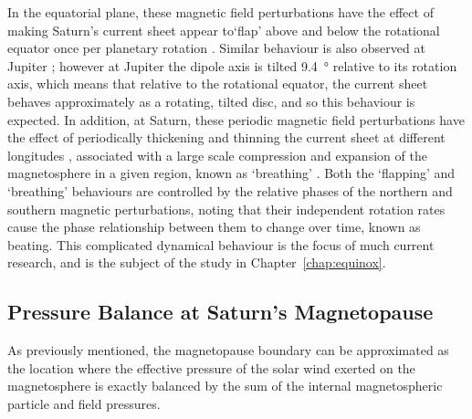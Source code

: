 In the equatorial plane, these magnetic field perturbations have the effect of making Saturn's current sheet appear to`flap' above and below the rotational equator once per planetary rotation \citep[e.g.][]{arridge2011}. Similar behaviour is also observed at Jupiter \citep[e.g][]{khurana1989}; however at Jupiter the dipole axis is tilted \SI{9.4}{\degree} relative to its rotation axis, which means that relative to the rotational equator, the current sheet behaves approximately as a rotating, tilted disc, and so this behaviour is expected. In addition, at Saturn, these periodic magnetic field perturbations have the effect of periodically thickening and thinning the current sheet at different longitudes \citep{provan2012}, associated with a large scale compression and expansion of the magnetosphere in a given region, known as `breathing' \citep{ramer2016}. Both the `flapping' and `breathing' behaviours are controlled by the relative phases of the northern and southern magnetic perturbations, noting that their independent rotation rates cause the phase relationship between them to change over time, known as beating. This complicated dynamical behaviour is the focus of much current research, and is the subject of the study in Chapter~\ref{chap:equinox}.

\subsection{Pressure Balance at Saturn's Magnetopause}\label{intro:sec:pbalance}
As previously mentioned, the magnetopause boundary can be approximated as the location where the effective pressure of the solar wind exerted on the magnetosphere is exactly balanced by the sum of the internal magnetospheric particle and field pressures. 

